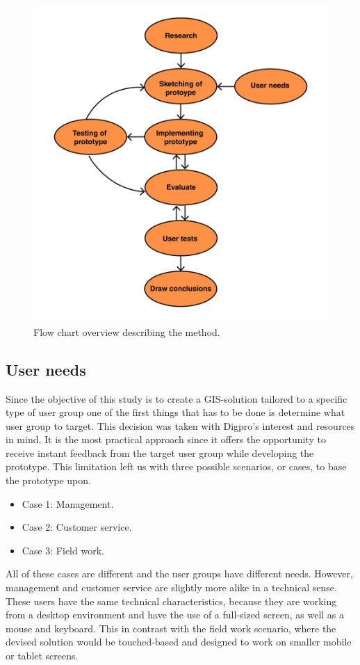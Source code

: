 \documentclass[a4paper,12pt,titlepage]{article}
\begin{document}
\begin{figure}[H]
    \centering
        \includegraphics[width=0.8\columnwidth]{Projektplan-01.jpg}
    \caption{Flow chart overview describing the method.}
    \label{fig:Projektplan}
\end{figure}

\subsection{User needs}

Since the objective of this study is to create a GIS-solution tailored to a specific type of user group one of the first things that has to be done is determine what user group to target. This decision was taken with Digpro's interest and resources in mind. It is the most practical approach since it offers the opportunity to receive instant feedback from the target user group while developing the prototype. This limitation left us with three possible scenarios, or cases, to base the prototype upon.

\begin{itemize}
    \item Case 1: Management.
    \item Case 2: Customer service.
    \item Case 3: Field work.
\end{itemize}

All of these cases are different and the user groups have different needs. However, management and customer service are slightly more alike in a technical sense. These users have the same technical characteristics, because they are working from a desktop environment and have the use of a full-sized screen, as well as a mouse and keyboard. This in contrast with the field work scenario, where the devised solution would be touched-based and designed to work on smaller mobile or tablet screens.
\end{document}
